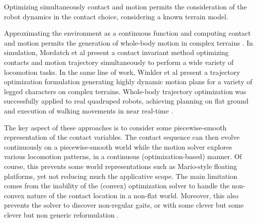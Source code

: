 Optimizing simultaneously contact and motion permits the consideration of the robot dynamics in the contact choice, considering a known terrain model.

Approximating the environment as a continuous function and computing contact and motion permits the generation of whole-body motion in complex terrains \cite{Dai_2014, posa2014}.
In simulation, Mordatch et al \cite{mordatch2012DiscCIopt} present a contact invariant method optimizing contacts and motion trajectory simultaneously to perform a wide variety of locomotion tasks.
In the same line of work, Winkler et al \cite{winkler2018GaitOpt} present a trajectory optimization formulation generating highly dynamic motion plans for a variety of legged characters on complex terrains.
Whole-body trajectory optimization was successfully applied to real quadruped robots, achieving planning on flat ground and execution of walking movements in near real-time \cite{Winkler2017_TO}.



The key aspect of these approaches is to consider some piecewise-smooth representation of the contact variables. The contact sequence can then evolve continuously on a piecewise-smooth world while the motion solver explores various locomotion patterns, in a continuous (optimization-based) manner. Of course, this prevents some world representations such as Mario-style floating platforms, yet not reducing much the applicative scope. The main limitation comes from the inability of the (convex) optimization solver to handle the non-convex nature of the contact location in a non-flat world. Moreover, this also prevents the solver to discover non-regular gaits, or with some clever but some clever but non generic reformulation \cite{winkler2018GaitOpt}.



